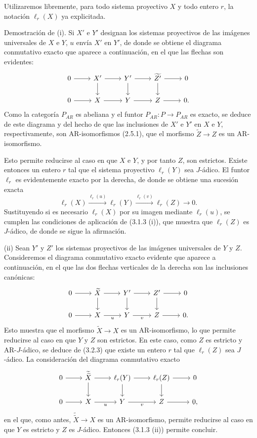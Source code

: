 \begin{prooftext}[Demostración]
Utilizaremos libremente, para todo sistema proyectivo $X$ y todo entero $r$, la notación $\ell_r(X)$ ya explicitada.

Demostración de (i). Si $X'$ e $Y'$ designan los sistemas proyectivos de las imágenes universales de $X$ e $Y$, $u$ envía $X'$ en $Y'$, de donde se obtiene el diagrama conmutativo exacto que aparece a continuación, en el que las flechas son evidentes:
\[
\begin{tikzcd}
0 \arrow[r] & X' \arrow[r] \arrow[d] & Y' \arrow[r] \arrow[d] & \widetilde{Z'} \arrow[r] \arrow[d] & 0\\
0 \arrow[r] & X \arrow[r] & Y \arrow[r] & Z \arrow[r] & 0 .
\end{tikzcd}
\]
Como la categoría $P_{AR}$ es abeliana y el funtor $P_{AR}\colon P\to P_{AR}$ es exacto, se deduce de este diagrama y del hecho de que las inclusiones de $X'$ e $Y'$ en $X$ e $Y$, respectivamente, son AR-isomorfismos (2.5.1), que el morfismo $\widetilde Z\to Z$ es un AR-isomorfismo.

Esto permite reducirse al caso en que $X$ e $Y$, y por tanto $Z$, son estrictos. Existe entonces un entero $r$ tal que el sistema proyectivo $\ell_r(Y)$ sea $J$-ádico. El funtor $\ell_r$ es evidentemente exacto por la derecha, de donde se obtiene una sucesión exacta
\[
\ell_r(X)\stackrel{\ell_r(u)}{\longrightarrow}\ell_r(Y)\stackrel{\ell_r(v)}{\longrightarrow}\ell_r(Z)\longrightarrow0.
\]
Sustituyendo si es necesario $\ell_r(X)$ por su imagen mediante $\ell_r(u)$, se cumplen las condiciones de aplicación de (3.1.3 (i)), que muestra que $\ell_r(Z)$ es $J$-ádico, de donde se sigue la afirmación.

(ii) Sean $Y'$ y $Z'$ los sistemas proyectivos de las imágenes universales de $Y$ y $Z$. Consideremos el diagrama conmutativo exacto evidente que aparece a continuación, en el que las dos flechas verticales de la derecha son las inclusiones canónicas:
\[
\begin{tikzcd}
0 \arrow[r] & \widetilde X \arrow[r] \arrow[d] & Y' \arrow[r] \arrow[d] & Z' \arrow[r] \arrow[d] & 0\\
0 \arrow[r] & X \arrow[r,"u"'] & Y \arrow[r,"v"'] & Z \arrow[r] & 0 .
\end{tikzcd}
\]
Esto muestra que el morfismo $\widetilde X\to X$ es un AR-isomorfismo, lo que permite reducirse al caso en que $Y$ y $Z$ son estrictos. En este caso, como $Z$ es estricto y AR-$J$-ádico, se deduce de (3.2.3) que existe un entero $r$ tal que $\ell_r(Z)$ sea $J$-ádico. La consideración del diagrama conmutativo exacto
\[
\begin{tikzcd}
0 \arrow[r] & \widetilde{\widetilde X} \arrow[r] \arrow[d] & \ell_r(Y) \arrow[r] \arrow[d] & \ell_r(Z) \arrow[r] \arrow[d] & 0\\
0 \arrow[r] & X \arrow[r,"u"'] & Y \arrow[r,"v"'] & Z \arrow[r] & 0,
\end{tikzcd}
\]
en el que, como antes, $\widetilde{\widetilde X}\to X$ es un AR-isomorfismo, permite reducirse al caso en que $Y$ es estricto y $Z$ es $J$-ádico. Entonces (3.1.3 (ii)) permite concluir.
\end{prooftext}
